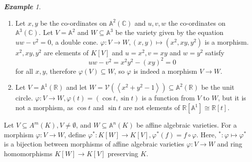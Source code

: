 \documentclass[titlepage]{article}
\theoremstyle{remark}
\newtheorem{example}[definition]{\textbf{Example}}
\renewcommand{\phi}{\varphi}
\begin{document}
\begin{example}
\begin{enumerate}
        but this is not a morphism.
      \item
        Let $x,y$ be the co-ordinates on $\mathbb{A}^2(\mathbb{C})$ and $u,v,w$ the co-ordinates on $\mathbb{A}^3(\mathbb{C})$. Let $V=\mathbb{A}^2$ and $W\subseteq \mathbb{A}^3$ be the variety given by the equation $uw-v^2=0$, a double cone. $\phi:V\to W,(x,y)\mapsto(x^2,xy,y^2)$ is a morphism. $x^2,xy,y^2$ are elements of $K[V]$ and $u=x^2,v=xy$ and $w=y^2$ satisfy
        \[uw-v^2=x^2y^2-(xy)^2=0\]
        for all $x,y$, therefore $\phi(V)\subseteq W$, so $\phi$ is indeed a morphism $V\to W$.
      \item 
        Let $V=\mathbb{A}^1(\mathbb{R})$ and let $W=\mathcal{V}\left(\left\langle x^2+y^2-1\right\rangle\right)\subseteq \mathbb{A}^2(\mathbb{R})$ be the unit circle. $\phi:V\to W,\phi(t)=(\cos{t},\sin{t})$ is a function from $V$ to $W$, but it is not a morphism, as $\cos{t}$ and $\sin{t}$ are not elements of $\mathbb{R}[\mathbb{A}^1]\cong \mathbb{R}[t]$.
    \end{enumerate}
  \end{example}
  \begin{theorem}
    Let $V\subseteq{A}^m(K),V\ne\emptyset$, and $W\subseteq \mathbb{A}^n(K)$ be affine algebraic varieties. For a morphism $\phi:V\to W$, define $\phi^*:K[W]\to K[V], \phi^*(f)=f\circ\phi$. Here, $^*:\phi\mapsto\phi^*$ is a bijection between morphisms of affine algebraic varieties $\phi:V\to W$ and ring homomorphisms $K[W]\to K[V]$ preserving $K$.
  \end{theorem}
\end{document}
